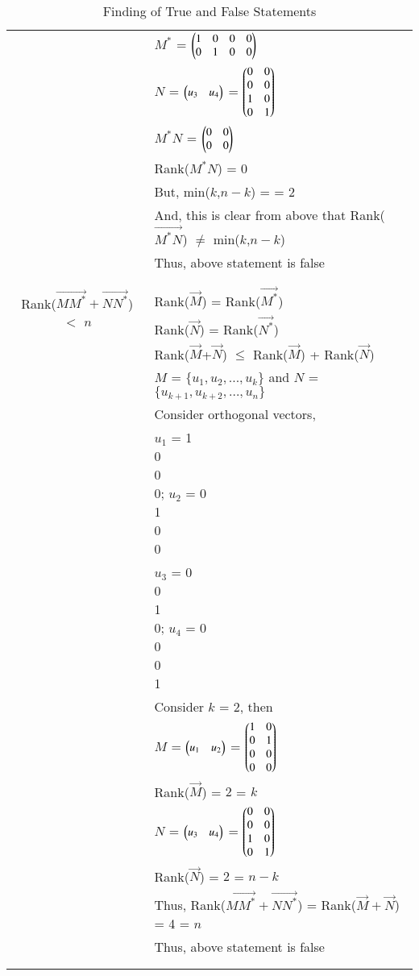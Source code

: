 \documentclass[journal,12pt]{IEEEtran}
\begin{document}
\begin{longtable}{|c|l|}
	& $M^*$ = $\begin{pmatrix}1&0&0&0\\0&1&0&0\end{pmatrix}$\\
	& $N$ = $\begin{pmatrix}u_3&u_4\end{pmatrix}$ = $\begin{pmatrix}0&0\\0&0\\1&0\\0&1\end{pmatrix}$\\
	& $M^*N$ = $\begin{pmatrix}0&0\\0&0\end{pmatrix}$\\
	& Rank($M^*N$) = 0\\
	& But, min($k$,$n-k$) = \brak{2,2} = 2 \\
	& And, this is clear from above that Rank($\vec{{M}^*N}$) $\ne$ min($k$,$n-k$)\\
	& Thus, above statement is false \\
	&\\
	\hline
	\multirow{3}{*}{Rank($\vec{M{M}^*}+\vec{N{N}^*}$) $<$ $n$} 
	& \\
	& Rank($\vec{M}$) = Rank($\vec{M^*}$)\\
	& Rank($\vec{N}$) = Rank($\vec{N^*}$)\\
	& Rank($\vec{M}$+$\vec{N}$) $\le$ Rank($\vec{M}$) + Rank($\vec{N}$)\\
	& $M$ = $\{u_1,u_2,...,u_k\}$ and $N$ = $\{u_{k+1},u_{k+2},...,u_n\}$ \\
	& Consider orthogonal vectors,\\
	& $u_1$ = \myvec{1\\0\\0\\0}; $u_2$ = \myvec{0\\1\\0\\0}\\
	& $u_3$ = \myvec{0\\0\\1\\0}; $u_4$ = \myvec{0\\0\\0\\1}\\
	& Consider $k$ = 2, then \\
	& $M$ = $\begin{pmatrix}u_1&u_2\end{pmatrix}$ = $\begin{pmatrix}1&0\\0&1\\0&0\\0&0\end{pmatrix}$\\
	& Rank($\vec{M}$) = $2$ = $k$\\
	& $N$ = $\begin{pmatrix}u_3&u_4\end{pmatrix}$ = $\begin{pmatrix}0&0\\0&0\\1&0\\0&1\end{pmatrix}$\\
	& Rank($\vec{N}$) = $2$ = $n-k$\\
	& Thus, Rank($\vec{M{M}^*}+\vec{N{N}^*}$) = Rank($\vec{M}+\vec{N}$) = 4 = $n$\\
	& Thus, above statement is false \\
	&\\
	\hline
	\caption{Finding of True and False Statements}
    \label{table:2}
\end{longtable}
\end{document}
